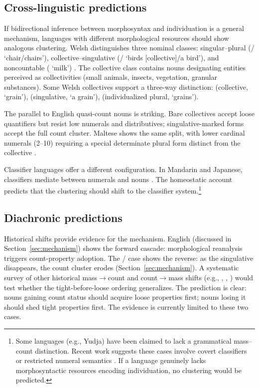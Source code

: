 \documentclass[12pt,a4paper]{article}
\begin{document}
\subsection{Cross-linguistic predictions}

If bidirectional inference between morphosyntax and individuation is a general mechanism, languages with different morphological resources should show analogous clustering. Welsh distinguishes three nominal classes: singular--plural (/ `chair/chairs'), collective--singulative (/ `birds [collective]/a bird'), and noncountable ( `milk') \citep[pp.~530--535]{grimm2018}. The collective class contains nouns designating entities perceived as collectivities (small animals, insects, vegetation, granular substances). Some Welsh collectives support a three-way distinction:  (collective, `grain'),  (singulative, `a grain'),  (individualized plural, `grains').

The parallel to English quasi-count nouns is striking. Bare collectives accept loose quantifiers but resist low numerals and distributives; singulative-marked forms accept the full count cluster. Maltese shows the same split, with lower cardinal numerals (2--10) requiring a special determinate plural form distinct from the collective \citep[p.~543]{grimm2018}.

Classifier languages offer a different configuration. In Mandarin and Japanese, classifiers mediate between numerals and nouns \citep{cheng1998,downing1996}. The homeostatic account predicts that the clustering should shift to the classifier system.\footnote{Some languages (e.g., Yudja) have been claimed to lack a grammatical mass--count distinction. Recent work suggests these cases involve covert classifiers or restricted numeral semantics \citep{lima2014}. If a language genuinely lacks morphosyntactic resources encoding individuation, no clustering would be predicted.}

\subsection{Diachronic predictions}

Historical shifts provide evidence for the mechanism. English  (discussed in Section~\ref{sec:mechanism}) shows the forward cascade: morphological reanalysis triggers count-property adoption. The / case shows the reverse: as the singulative disappears, the count cluster erodes (Section~\ref{sec:mechanism}). A systematic survey of other historical mass$\to$count and count$\to$mass shifts (e.g., , , ) would test whether the tight-before-loose ordering generalizes. The prediction is clear: nouns gaining count status should acquire loose properties first; nouns losing it should shed tight properties first. The evidence is currently limited to these two cases.
\end{document}
